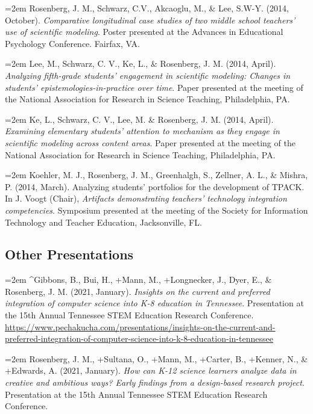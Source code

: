 \documentclass[
  14,
]{article}
\begin{document}
\hangindent=2em Rosenberg, J. M., Schwarz, C.V., Akcaoglu, M., \& Lee,
S.W-Y. (2014, October). \emph{Comparative longitudinal case studies of
two middle school teachers' use of scientific modeling}. Poster
presented at the Advances in Educational Psychology Conference. Fairfax,
VA.

\hangindent=2em Lee, M., Schwarz, C. V., Ke, L., \& Rosenberg, J. M.
(2014, April). \emph{Analyzing fifth-grade students' engagement in
scientific modeling: Changes in students' epistemologies-in-practice
over time}. Paper presented at the meeting of the National Association
for Research in Science Teaching, Philadelphia, PA.

\hangindent=2em Ke, L., Schwarz, C. V., Lee, M. \& Rosenberg, J. M.
(2014, April). \emph{Examining elementary students' attention to
mechanism as they engage in scientific modeling across content areas}.
Paper presented at the meeting of the National Association for Research
in Science Teaching, Philadelphia, PA.

\hangindent=2em Koehler, M. J., Rosenberg, J. M., Greenhalgh, S.,
Zellner, A. L., \& Mishra, P. (2014, March). Analyzing students'
portfolios for the development of TPACK. In J. Voogt (Chair),
\emph{Artifacts demonstrating teachers' technology integration
competencies}. Symposium presented at the meeting of the Society for
Information Technology and Teacher Education, Jacksonville, FL.

\hypertarget{other-presentations}{%
\subsection{Other Presentations}\label{other-presentations}}

\hangindent=2em \^{}Gibbons, B., Bui, H., +Mann, M., +Longnecker, J.,
Dyer, E., \& Rosenberg, J. M. (2021, January). \emph{Insights on the
current and preferred integration of computer science into K-8 education
in Tennessee}. Presentation at the 15th Annual Tennessee STEM Education
Research Conference.
\url{https://www.pechakucha.com/presentations/insights-on-the-current-and-preferred-integration-of-computer-science-into-k-8-education-in-tennessee}

\hangindent=2em Rosenberg, J. M., +Sultana, O., +Mann, M., +Carter, B.,
+Kenner, N., \& +Edwards, A. (2021, January). \emph{How can K-12 science
learners analyze data in creative and ambitious ways? Early findings
from a design-based research project}. Presentation at the 15th Annual
Tennessee STEM Education Research Conference.
\end{document}
